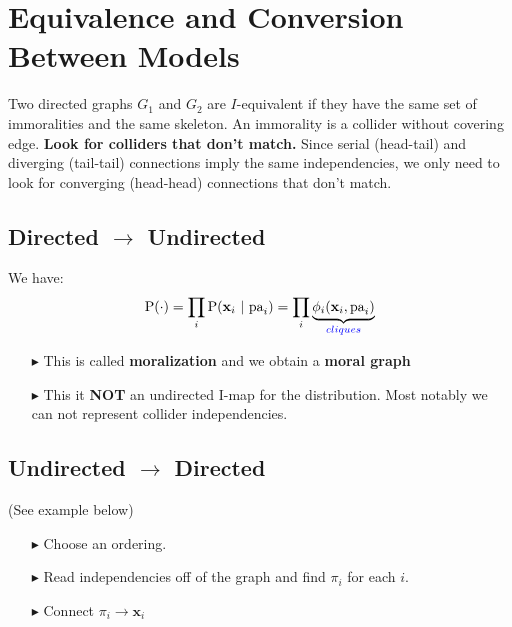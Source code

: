 \documentclass{article}
\newcommand{\prob}{\text{P}}
\newcommand{\pr}{\prob}
\newcommand{\pa}{\text{pa}_i}
\renewcommand{\vec}[1]{\mathbf{#1}}
\newcommand{\bx}{\vec{x}}
\newcommand{\giv}{\ |\ }
\newcommand{\blue}[1]{\textcolor{blue}{#1}}
\begin{document}
\section{Equivalence and Conversion Between Models}
Two directed graphs $G_1$ and $G_2$ are $I$-equivalent if they have the same set of immoralities and the same skeleton. An immorality is a collider without covering edge. \textbf{Look for colliders that don't match.} Since serial (head-tail) and diverging (tail-tail) connections imply the same independencies, we only need to look for converging (head-head) connections that don't match.

\subsection{Directed $\to$ Undirected}
We have:
\begin{equation*}
    \pr(\cdot) = \prod_i \pr(\bx_i \giv \pa) =
        \prod_i \underbrace{\phi_i(\bx_i, \pa)}_{\blue{cliques}}
\end{equation*}

\begin{itemize}
    \item[$\blacktriangleright$] This is called \textbf{moralization} and we obtain a \textbf{moral graph}
    \item[$\blacktriangleright$] This it \textbf{NOT} an undirected I-map for the distribution. Most notably
        we can not represent collider independencies. 
\end{itemize}

\subsection{Undirected $\to$ Directed}
(See example below)
\begin{itemize}
    \item[$\blacktriangleright$] Choose an ordering.
    \item[$\blacktriangleright$] Read independencies off of the graph and find $\pi_i$ for each $i$.
    \item[$\blacktriangleright$] Connect $\pi_i \to \bx_i$
\end{itemize}
\end{document}
